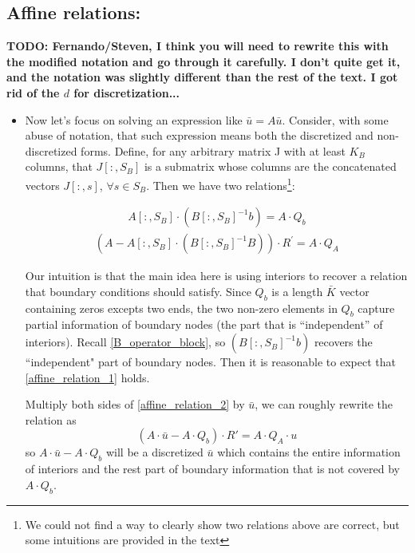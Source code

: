 \documentclass[11pt]{article}
\begin{document}
		\subsection{Affine relations:}
		\textbf{TODO: Fernando/Steven, I think you will need to rewrite this with the modified notation and go through it carefully.  I don't quite get it, and the notation was slightly different than the rest of the text.  I got rid of the $d$ for discretization...}
		\begin{itemize}
			\item Now let's focus on solving an expression like $\bar{u} = A \bar{u}$. Consider, with some abuse of notation, that such expression means both the discretized and non-discretized forms. Define, for any arbitrary matrix J with at least $K_B$ columns, that $J[:,S_B]$ is a submatrix whose columns are the concatenated vectors $J[:,s]$, $\forall s \in S_B$.
			Then we have two relations\footnote{We could not find a way to clearly show two relations above are correct, but some intuitions are provided in the text}:

			\begin{align}
			A [:,S_B] \cdot\left(B[:,S_B]^{-1} b \right) = A \cdot Q_b\label{affine_relation_1}
			\end{align}
			\begin{align}
			(A -A [:,S_B] \cdot(B[:,S_B]^{-1} B))\cdot R^{'} = A \cdot Q_A\label{affine_relation_2}
			\end{align}

			Our intuition is that the main idea here is using interiors to recover a relation that boundary conditions should satisfy. Since $Q_b$ is a length $\bar{K}$ vector containing zeros excepts two ends, the two non-zero elements in $Q_b$ capture partial information of boundary nodes (the part that is ``independent'' of interiors).  Recall \eqref{B_operator_block}, so $\left(B[:,S_B]^{-1} b \right)$ recovers the ``independent" part of boundary nodes. Then it is reasonable to expect that \eqref{affine_relation_1} holds.

			Multiply both sides of \eqref{affine_relation_2} by $\bar{u}$, we can roughly rewrite the relation as
			\begin{equation}
			(A \cdot \bar{u}-A \cdot Q_b) \cdot R' = A \cdot Q_A\cdot u
			\end{equation}
			so $A \cdot \bar{u}-A \cdot Q_b$ will be a discretized $\bar{u}$ which contains the entire information of interiors and the rest part of boundary information that is not covered by $A \cdot Q_b$.


\end{itemize}
\end{document}
